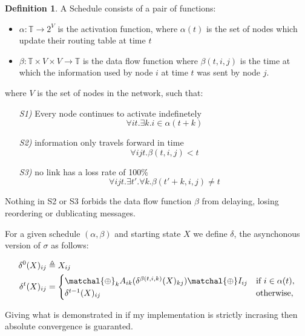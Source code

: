 \documentclass[10pt,conference,letterpaper]{IEEEtran}
\theoremstyle{definition}
\newtheorem{definition}{Definition}
\theoremstyle{remark}
\newcommand{\semiringchoice}{\ensuremath{\matchal{\oplus}}\xspace}
\begin{document}
\theoremstyle{definition}
\begin{definition}
	A Schedule consists of a pair of functions:
	\begin{itemize}
		\item $\alpha : \mathbb{T} \rightarrow 2^{V}$ is the activation function,
			where $\alpha(t)$ is the set of nodes which update their routing table
			at time $t$
		\item $\beta : \mathbb{T} \times V \times V \rightarrow \mathbb{T}$ is the
			data flow function where $\beta(t,i,j)$ is the time at which the 
			information used by node $i$ at time $t$ was sent by node $j$.
	\end{itemize}
	where $V$ is the set of nodes in the network, such that:
	\begin{itemize}
		\item[\textit{S1)}] Every node continues to activate indefinetely
			$$\forall it . \exists k. i \in \alpha(t + k) $$
		\item[\textit{S2)}] information only travels forward in time
			$$\forall ijt . \beta(t, i, j) < t $$
		\item[\textit{S3)}] no link has a loss rate of \num{100}\%
			$$\forall ijt. \exists t' . \forall k. \beta(t' + k, i, j) \neq t $$
	\end{itemize}
\end{definition}

Nothing in S2 or S3 forbids the data flow function $\beta$ from delaying, losing
reordering or dublicating messages.

For a given schedule $(\alpha, \beta)$ and starting state $X$ we define $\delta$,
the asynchonous version of $\sigma$ as follows:

\begin{equation}
	\begin{align*}
		\delta^{0}(X)_{ij} &\triangleq X_{ij} \\
	\delta^{t}(X)_{ij} &=
	\begin{cases}
		\semiringchoice_{k}A_{ik}(\delta^{\beta(t,i,k)}(X)_{kj})\semiringchoice I_{ij}
		 & \text{if $i \in \alpha(t)$}, \\
		\delta^{t-1}(X)_{ij}
	     & \text{otherwise}, \\
 	\end{cases} 
	\end{align*}
\end{equation}

Giving what is demonstrated in \cite{daggitt2018asynchronous} if my implementation
is strictly incrasing then absolute convergence is guaranted.



\end{document}
